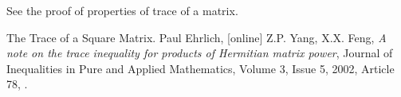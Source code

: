 \documentclass[12pt]{article}
\begin{document}
See the proof of properties of trace of a matrix.

\begin{thebibliography}{9}
The Trace of a Square Matrix. Paul Ehrlich, [online] 
Z.P. Yang,  X.X. Feng, \emph{A note on the trace inequality for 
products of Hermitian matrix power},
Journal of Inequalities in Pure and Applied Mathematics,
Volume 3,  Issue 5, 2002, Article 78, 
.
\end{thebibliography}
\end{document}
